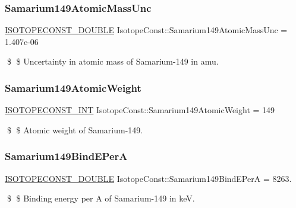 \subsubsection{\texorpdfstring{Samarium149\+Atomic\+Mass\+Unc}{Samarium149AtomicMassUnc}}
{\footnotesize\ttfamily \mbox{\hyperlink{group___isotope_const-_macros_ga8f45a7272ce02c0b4c65c44636ed719a}{I\+S\+O\+T\+O\+P\+E\+C\+O\+N\+S\+T\+\_\+\+D\+O\+U\+B\+LE}} Isotope\+Const\+::\+Samarium149\+Atomic\+Mass\+Unc = 1.\+407e-\/06}

\$ \$ Uncertainty in atomic mass of Samarium-\/149 in amu. \mbox{\label{group___isotope_const-_samarium-_sm149_ga05afbaa11258a97e438d202259dc356f}} 
\subsubsection{\texorpdfstring{Samarium149\+Atomic\+Weight}{Samarium149AtomicWeight}}
{\footnotesize\ttfamily \mbox{\hyperlink{group___isotope_const-_macros_ga5f18360b3e99483a35c32d789e62621c}{I\+S\+O\+T\+O\+P\+E\+C\+O\+N\+S\+T\+\_\+\+I\+NT}} Isotope\+Const\+::\+Samarium149\+Atomic\+Weight = 149}

\$ \$ Atomic weight of Samarium-\/149. \mbox{\label{group___isotope_const-_samarium-_sm149_gabfe6fca21aa14943d70adbf2bac009cf}} 
\subsubsection{\texorpdfstring{Samarium149\+Bind\+E\+PerA}{Samarium149BindEPerA}}
{\footnotesize\ttfamily \mbox{\hyperlink{group___isotope_const-_macros_ga8f45a7272ce02c0b4c65c44636ed719a}{I\+S\+O\+T\+O\+P\+E\+C\+O\+N\+S\+T\+\_\+\+D\+O\+U\+B\+LE}} Isotope\+Const\+::\+Samarium149\+Bind\+E\+PerA = 8263.}

\$ \$ Binding energy per A of Samarium-\/149 in keV. \mbox{\label{group___isotope_const-_samarium-_sm149_gad05e7db72c0aa22b7656a46f5c3a4c55}} 
